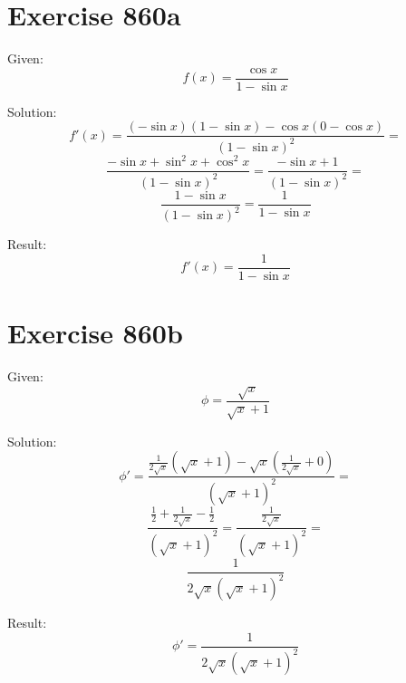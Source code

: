 \documentclass[a4paper, 10pt]{scrartcl}
\begin{document}
\section{Exercise 860a}

Given:
\[
f(x) = \frac{\cos{x}}{1 - \sin{x}}
\]

Solution:
\[
f'(x) = \frac{(-\sin{x})(1 - \sin{x}) - \cos{x}(0 - \cos{x})}{(1 - \sin{x})^{2}} =
\]
\[
\frac{-\sin{x} + \sin^{2}{x} + \cos^{2}{x}}{(1 - \sin{x})^{2}} = \frac{-\sin{x} + 1}{(1 - \sin{x})^{2}} =
\]
\[
\frac{1 - \sin{x}}{(1 - \sin{x})^{2}} = \frac{1}{1 - \sin{x}}
\]

Result:
\[
f'(x) = \frac{1}{1 - \sin{x}}
\]

\section{Exercise 860b}

Given:
\[
\phi = \frac{\sqrt{x}}{\sqrt{x} + 1}
\]

Solution:
\[
\phi' = \frac{\frac{1}{2\sqrt{x}}(\sqrt{x} + 1) - \sqrt{x}(\frac{1}{2\sqrt{x}} + 0)}{(\sqrt{x} + 1)^{2}} =
\]
\[
\frac{\frac{1}{2} + \frac{1}{2\sqrt{x}} - \frac{1}{2}}{(\sqrt{x} + 1)^{2}} = \frac{\frac{1}{2\sqrt{x}}}{(\sqrt{x} + 1)^{2}} =
\]
\[
\frac{1}{2\sqrt{x}(\sqrt{x} + 1)^{2}}
\]

Result:
\[
\phi' = \frac{1}{2\sqrt{x}(\sqrt{x} + 1)^{2}}
\]
\end{document}
